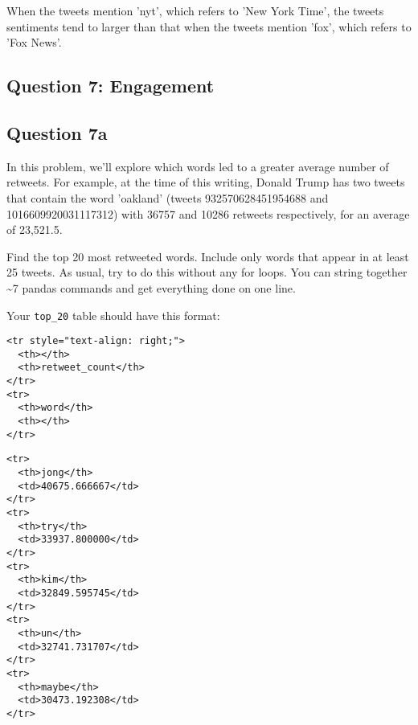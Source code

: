 \documentclass[11pt]{article}
\begin{document}
    When the tweets mention 'nyt', which refers to 'New York Time', the
tweets sentiments tend to larger than that when the tweets mention
'fox', which refers to 'Fox News'.

    \subsection{Question 7: Engagement}\label{question-7-engagement}

\subsection{Question 7a}\label{question-7a}

In this problem, we'll explore which words led to a greater average
number of retweets. For example, at the time of this writing, Donald
Trump has two tweets that contain the word 'oakland' (tweets
932570628451954688 and 1016609920031117312) with 36757 and 10286
retweets respectively, for an average of 23,521.5.

Find the top 20 most retweeted words. Include only words that appear in
at least 25 tweets. As usual, try to do this without any for loops. You
can string together \textasciitilde{}7 pandas commands and get
everything done on one line.

Your \texttt{top\_20} table should have this format:

\begin{verbatim}
<tr style="text-align: right;">
  <th></th>
  <th>retweet_count</th>
</tr>
<tr>
  <th>word</th>
  <th></th>
</tr>
\end{verbatim}

\begin{verbatim}
<tr>
  <th>jong</th>
  <td>40675.666667</td>
</tr>
<tr>
  <th>try</th>
  <td>33937.800000</td>
</tr>
<tr>
  <th>kim</th>
  <td>32849.595745</td>
</tr>
<tr>
  <th>un</th>
  <td>32741.731707</td>
</tr>
<tr>
  <th>maybe</th>
  <td>30473.192308</td>
</tr>
\end{verbatim}
\end{document}
